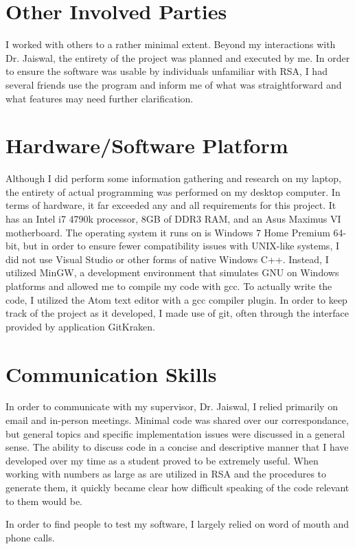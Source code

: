 \documentclass[11pt]{article}
\begin{document}
\section{Other Involved Parties}
I worked with others to a rather minimal extent. Beyond my interactions with Dr. Jaiswal, the entirety of the project was planned and executed by me. In order to ensure the software was usable by individuals unfamiliar with RSA, I had several friends use the program and inform me of what was straightforward and what features may need further clarification.

\section{Hardware/Software Platform}
Although I did perform some information gathering and research on my laptop, the entirety of actual programming was performed on my desktop computer. In terms of hardware, it far exceeded any and all requirements for this project. It has an Intel i7 4790k processor, 8GB of DDR3 RAM, and an Asus Maximus VI motherboard. The operating system it runs on is Windows 7 Home Premium 64-bit, but in order to ensure fewer compatibility issues with UNIX-like systems, I did not use Visual Studio or other forms of native Windows C++. Instead, I utilized MinGW, a development environment that simulates GNU on Windows platforms and allowed me to compile my code with gcc. To actually write the code, I utilized the Atom text editor with a gcc compiler plugin. In order to keep track of the project as it developed, I made use of git, often through the interface provided by application GitKraken.

\section{Communication Skills}
In order to communicate with my supervisor, Dr. Jaiswal, I relied primarily on email and in-person meetings. Minimal code was shared over our correspondance, but general topics and specific implementation issues were discussed in a general sense. The ability to discuss code in a concise and descriptive manner that I have developed over my time as a student proved to be extremely useful. When working with numbers as large as are utilized in RSA and the procedures to generate them, it quickly became clear how difficult speaking of the code relevant to them would be. 

In order to find people to test my software, I largely relied on word of mouth and phone calls.
\end{document}
